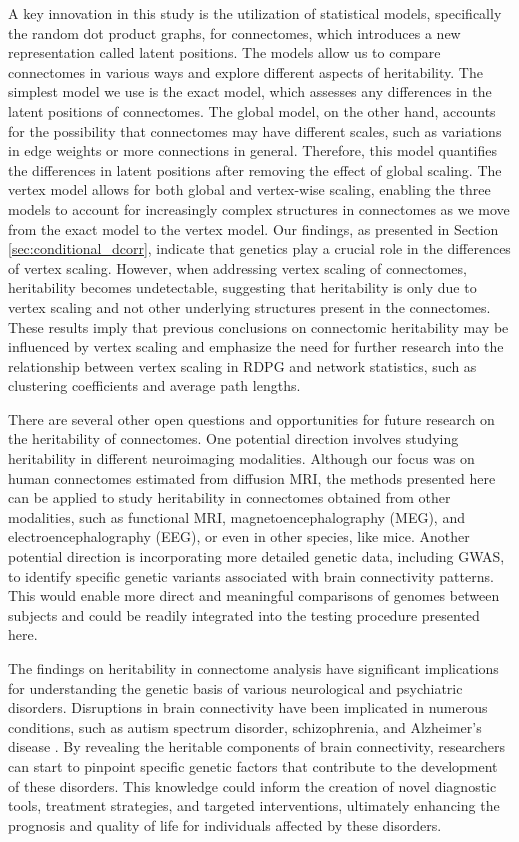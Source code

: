 A key innovation in this study is the utilization of statistical models, specifically the random dot product graphs, for connectomes, which introduces a new representation called latent positions. The models allow us to compare connectomes in various ways and explore different aspects of heritability. The simplest model we use is the exact model, which assesses any differences in the latent positions of connectomes. The global model, on the other hand, accounts for the possibility that connectomes may have different scales, such as variations in edge weights or more connections in general. Therefore, this model quantifies the differences in latent positions after removing the effect of global scaling. The vertex model allows for both global and vertex-wise scaling, enabling the three models to account for increasingly complex structures in connectomes as we move from the exact model to the vertex model. Our findings, as presented in Section \ref{sec:conditional_dcorr}, indicate that genetics play a crucial role in the differences of vertex scaling. However, when addressing vertex scaling of connectomes, heritability becomes undetectable, suggesting that heritability is only due to vertex scaling and not other underlying structures present in the connectomes. These results imply that previous conclusions on connectomic heritability may be influenced by vertex scaling and emphasize the need for further research into the relationship between vertex scaling in RDPG and network statistics, such as clustering coefficients and average path lengths.

There are several other open questions and opportunities for future research on the heritability of connectomes. One potential direction involves studying heritability in different neuroimaging modalities. Although our focus was on human connectomes estimated from diffusion MRI, the methods presented here can be applied to study heritability in connectomes obtained from other modalities, such as functional MRI, magnetoencephalography (MEG), and electroencephalography (EEG), or even in other species, like mice. Another potential direction is incorporating more detailed genetic data, including GWAS, to identify specific genetic variants associated with brain connectivity patterns. This would enable more direct and meaningful comparisons of genomes between subjects and could be readily integrated into the testing procedure presented here.

The findings on heritability in connectome analysis have significant implications for understanding the genetic basis of various neurological and psychiatric disorders. Disruptions in brain connectivity have been implicated in numerous conditions, such as autism spectrum disorder, schizophrenia, and Alzheimer's disease \cite{van2019cross, fornito2015connectomics}. By revealing the heritable components of brain connectivity, researchers can start to pinpoint specific genetic factors that contribute to the development of these disorders. This knowledge could inform the creation of novel diagnostic tools, treatment strategies, and targeted interventions, ultimately enhancing the prognosis and quality of life for individuals affected by these disorders.

